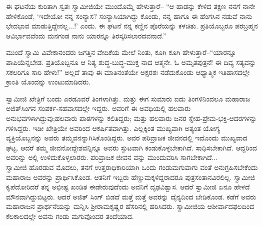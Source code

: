 ಈ ಘಟನೆಯ ಕುರಿತಾಗಿ ಸ್ವತಃ ಸ್ವಾಮೀಜಿಯೇ ಮುಂದೊಮ್ಮೆ ಹೇಳುತ್ತಾರೆ– “ಆ ಹಾಡನ್ನು ಕೇಳಿದ ತಕ್ಷಣ ನನಗೆ ನಾನೇ ಹೇಳಿಕೊಂಡೆ, ‘ಇದೇಯೋ ನನ್ನ ಸಂನ್ಯಾಸ? ಸಂನ್ಯಾಸಿಯಾಗಿದ್ದು ಕೊಂಡು, ನನ್ನ ಹಾಗೂ ಈ ಹೆಂಗಸಿನ ನಡುವೆ ನಾನು ಭೇದಭಾವ ಮಾಡುತ್ತಿದ್ದೇನಲ್ಲ...!’ ಎಂದು. ಈ ಘಟನೆ ನನ್ನ ಕಣ್ಣಿನ ಪೊರೆಯನ್ನು ಕಳಚಿತು. ಪ್ರತಿಯೊಬ್ಬರೂ ಪರಬ್ರಹ್ಮನ ಆವಿರ್ಭಾವವೆಂದು ಮನಗಂಡ ನಾನು ಯಾರನ್ನೂ ತಿರಸ್ಕರಿಸಲಾರದವನಾದೆ.”

ಮುಂದೆ ಸ್ವಾಮಿ ವಿವೇಕಾನಂದರು ಜಗತ್ತಿನ ವೇದಿಕೆಯ ಮೇಲೆ ನಿಂತು, ಕೂಗಿ ಕೂಗಿ ಹೇಳುತ್ತಾರೆ–“ಯಾರನ್ನೂ ಪಾಪಿಯೆನ್ನಬೇಡ. ಪ್ರತಿಯೊಬ್ಬನೂ ಆ ನಿತ್ಯ ಶುದ್ಧ-ಬುದ್ಧ-ಮುಕ್ತ ನಾದ ಆತ್ಮನೇ. ಓ ಅಮೃತಪುತ್ರನೆ! ಈ ದಿವ್ಯ ಸತ್ಯವನ್ನು ಸಕಲರಿಗೂ ಸಾರಿ ಹೇಳು!” ಅಲ್ಲದೆ ತಾವು ಈ ಮಾತಿನಂತೆಯೇ ಅಕ್ಷರಶಃ ನಡೆದುಕೊಂಡು ಆಧ್ಯಾತ್ಮಿಕ ಇತಿಹಾಸದಲ್ಲೇ ಕ್ರಾಂತಿ ಯೊಂದನ್ನು ಉಂಟುಮಾಡಿದರು.

ಸ್ವಾಮೀಜಿ ಖೇತ್ರಿಗೆ ಬಂದು ಎರಡೂವರೆ ತಿಂಗಳಾಗಿತ್ತು. ಮತ್ತು ಈಗ ಸುಮಾರು ಐದು ತಿಂಗಳಿನಿಂದಲೂ ಮಹಾರಾಜ ಅಜಿತ್​ಸಿಂಗನ ಸಂಪರ್ಕ-ಸಹವಾಸದಲ್ಲೇ ಇದ್ದರು. ಅವರಿಗೆ ಈ ಅವಧಿಯಲ್ಲಿ ಹಲವಾರು ಅನುಭವಗಳಾಗಿದ್ದುವು;ಹಲವಾರು ಪಾಠಗಳನ್ನು ಕಲಿತಿದ್ದರು; ಮತ್ತು ಹಲವಾರು ಜನರ ಸ್ನೇಹ-ಪ್ರೇಮ-ಭಕ್ತಿ-ಆದರಗಳನ್ನು ಗಳಿಸಿದ್ದರು. ಇಡೀ ಖೇತ್ರಿಯೇ ಅವರಿಂದ ಆಕರ್ಷಿತವಾಗಿತ್ತು. ಎಲ್ಲಕ್ಕಿಂತ ಮುಖ್ಯವಾಗಿ ಅತ್ಯಂತ ಯೋಗ್ಯ ವ್ಯಕ್ತಿಯೊಬ್ಬನನ್ನು ಅವರು ತಮ್ಮವನನ್ನಾಗಿಸಿಕೊಂಡಿದ್ದರು. ಅವರ ಪರಿವ್ರಾಜಕ ಜೀವನದಲ್ಲಿ ಇದೊಂದು ಮುಖ್ಯವಾದ ಘಟ್ಟ. ಆದರೆ ತಮ್ಮ ಜೀವನೋದ್ದೇಶವನ್ನಿನ್ನೂ ಅವರು ಸ್ಫುಟವಾಗಿ ಕಂಡುಕೊಳ್ಳಬೇಕಾಗಿದೆ. ಸಾಧಿಸಬೇಕಾಗಿದೆ. ಆದ್ದರಿಂದ ಅವರಿನ್ನು ಅಲ್ಲಿ ಉಳಿದುಕೊಳ್ಳಲಾರರು. ಪರಿವ್ರಾಜಕ ಜೀವನ ವನ್ನು ಮುಂದುವರಿಸಿ ಸಾಗಬೇಕಾಗಿದೆ...\\ಸ್ವಾಮೀಜಿ ಹೊರಡುವ ಮೊದಲು, ತನಗೆ ಉತ್ತರಾಧಿಕಾರಿಯಾಗಿ ಒಂದು ಗಂಡುಮಗುವಾಗು ವಂತೆ ಅನುಗ್ರಹಿಸಬೇಕೆಂದು ಮಹಾರಾಜ ಅವರನ್ನು ಪ್ರಾರ್ಥಿಸಿಕೊಂಡ. ಆತನಿಗೆ ಇಬ್ಬರು ಹೆಣ್ಣುಮಕ್ಕಳಿದ್ದರಾದರೂ ಪುತ್ರಸಂತಾನವಿರಲಿಲ್ಲ. ಸ್ವಾಮೀಜಿ ಕೃಪೆದೋರಿದರೆ ತನ್ನ ಅಭೀಷ್ಟ ಖಂಡಿತ ಈಡೇರುವುದೆಂದು ಅವನಿಗೆ ದೃಢವಿಶ್ವಾಸ. ಆದರೆ ಸ್ವಾಮೀಜಿ ಏನೂ ಹೇಳದೆ ಮೌನವಾಗಿದ್ದುಬಿಟ್ಟರು. ಆದರೆ ಅಜಿತ್ ಸಿಂಗ್ ಬಿಡದೆ ಮತ್ತೆ ಮತ್ತೆ ಅವರನ್ನು ದೈನ್ಯದಿಂದ ಬೇಡಿಕೊಂಡ. ಕಡೆಗೆ ಅವರು ಮಹಾರಾಜನ ಪ್ರಾರ್ಥನೆಯನ್ನು ಮನ್ನಿಸಿ ಶ್ರೀರಾಮಕೃಷ್ಣರ ಹೆಸರಿನಲ್ಲಿ ಹರಿಸಿದರು. ಸ್ವಾಮೀಜಿಯ ಆಶೀರ್ವಾದಫಲದಿಂದ ಕೆಲಕಾಲದಲ್ಲೇ ಅವನು ಗಂಡು ಮಗುವೊಂದರ ತಂದೆಯಾದ.

